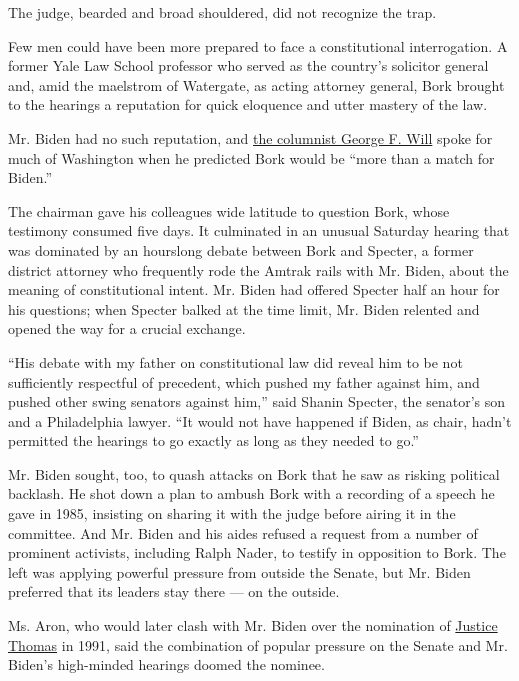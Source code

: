 The judge, bearded and broad shouldered, did not recognize the trap.

Few men could have been more prepared to face a constitutional
interrogation. A former Yale Law School professor who served as the
country's solicitor general and, amid the maelstrom of Watergate, as
acting attorney general, Bork brought to the hearings a reputation for
quick eloquence and utter mastery of the law.

Mr. Biden had no such reputation, and
\href{https://www.washingtonpost.com/archive/opinions/1987/07/02/biden-v-bork/be124295-d2a5-4353-ad3a-a05c20ee0c32/}{the
columnist George F. Will} spoke for much of Washington when he predicted
Bork would be ``more than a match for Biden.''

The chairman gave his colleagues wide latitude to question Bork, whose
testimony consumed five days. It culminated in an unusual Saturday
hearing that was dominated by an hourslong debate between Bork and
Specter, a former district attorney who frequently rode the Amtrak rails
with Mr. Biden, about the meaning of constitutional intent. Mr. Biden
had offered Specter half an hour for his questions; when Specter balked
at the time limit, Mr. Biden relented and opened the way for a crucial
exchange.

``His debate with my father on constitutional law did reveal him to be
not sufficiently respectful of precedent, which pushed my father against
him, and pushed other swing senators against him,'' said Shanin Specter,
the senator's son and a Philadelphia lawyer. ``It would not have
happened if Biden, as chair, hadn't permitted the hearings to go exactly
as long as they needed to go.''

Mr. Biden sought, too, to quash attacks on Bork that he saw as risking
political backlash. He shot down a plan to ambush Bork with a recording
of a speech he gave in 1985, insisting on sharing it with the judge
before airing it in the committee. And Mr. Biden and his aides refused a
request from a number of prominent activists, including Ralph Nader, to
testify in opposition to Bork. The left was applying powerful pressure
from outside the Senate, but Mr. Biden preferred that its leaders stay
there --- on the outside.

Ms. Aron, who would later clash with Mr. Biden over the nomination of
\href{https://www.nytimes.com/2019/04/26/us/politics/anita-hill-biden-clarence-thomas.html}{Justice
Thomas} in 1991, said the combination of popular pressure on the Senate
and Mr. Biden's high-minded hearings doomed the nominee.

